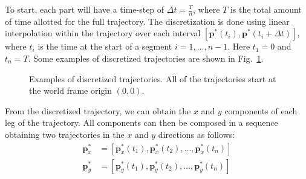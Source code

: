 \documentclass[letterpaper, 10 pt, conference]{ieeeconf}  %
\newcommand\NB[1]{$\spadesuit$\footnote{NB: #1}}
\begin{document}
To start, each part will have a time-step of $\Delta t = \frac{T}{n}$, where $T$ is the total amount of time allotted for the full trajectory. The discretization is done using linear interpolation within the trajectory over each interval $[\bm{p}^*(t_i), \bm{p}^*(t_i+\Delta t)]$, where $t_i$ is the time at the start of a segment $i=1, \ldots, n-1$. Here $t_1=0$ and $t_n=T$. 
Some examples of discretized trajectories are shown in Fig.~\ref{fig:trajs}. 
\begin{figure}[h]
	\centering
	\caption{Examples of discretized trajectories. All of the trajectories start at the world frame origin $(0,0)$.}
	\label{fig:trajs}
\end{figure}

From the discretized trajectory, we can obtain the $x$ and $y$ components of each leg of the trajectory. All components can then be composed in a sequence obtaining two trajectories in the $x$ and $y$ directions as follows:
\begin{align}
    \bm{p}_x^*&=\left[ \bm{p}_x^*(t_1), \bm{p}_x^*(t_2), \ldots, \bm{p}_x^*(t_{n})\right] \nonumber \\
    \bm{p}_y^*&=\left[ \bm{p}_y^*(t_1), \bm{p}_y^*(t_2), \ldots, \bm{p}_y^*(t_{n})\right]
\end{align}
\end{document}
